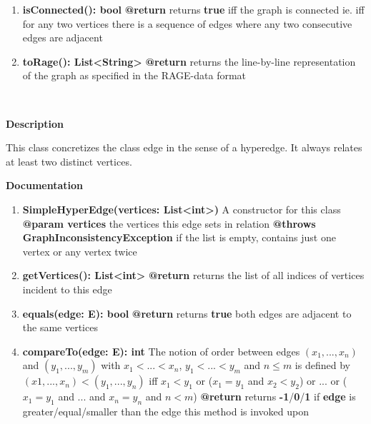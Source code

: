 \begin{enumerate}[+]
{		}
		\item{
			\textbf{isConnected(): bool} \newline
			\textbf{@return} returns \textbf{true} iff the graph is connected ie. iff for any two vertices there is a sequence of edges where any two consecutive edges are adjacent
		}
		\item{
			\textbf{toRage(): List<String>} \newline
			\textbf{@return} returns the line-by-line representation of the graph as specified in the RAGE-data format
		}
	\end{enumerate}
	
	~\newline
	~\newline
	~\newline
	
	
	\textbf{Description}
	
	This class concretizes the class edge in the sense of a hyperedge. It always relates at least two distinct vertices.
	
	\textbf{Documentation}
	\begin{enumerate}[+]
		\item{
			\textbf{SimpleHyperEdge(vertices: List<int>)} \newline
			A constructor for this class \newline
			\textbf{@param vertices} the vertices this edge sets in relation \newline
			\textbf{@throws GraphInconsistencyException} if the list is empty, contains just one vertex or any vertex twice			
		}
		\item{
			\textbf{getVertices(): List<int>} \newline
			\textbf{@return} returns the list of all indices of vertices incident to this edge
		}
		\item{
			\textbf{equals(edge: E): bool} \newline
			\textbf{@return} returns \textbf{true} both edges are adjacent to the same vertices
		}
		\item{
			\textbf{compareTo(edge: E): int} \newline
			The notion of order between edges $(x_1, ..., x_n)$ and $(y_1, ..., y_m)$ with $x_1 < ... < x_n$, $y_1 < ... < y_m$ and $n \leq m$ is defined by $(x1, ..., x_n)<(y_1,...,y_n)$ iff $x_1 < y_1$ or ($x_1=y_1$ and $x_2 < y_2$) or ... or ($x_1 = y_1$ and ... and $x_n = y_n$ and $n < m$) \newline
			\textbf{@return} returns \textbf{-1}/\textbf{0}/\textbf{1} if \textbf{edge} is greater/equal/smaller than the edge this method is invoked upon
		}
	\end{enumerate}
	
